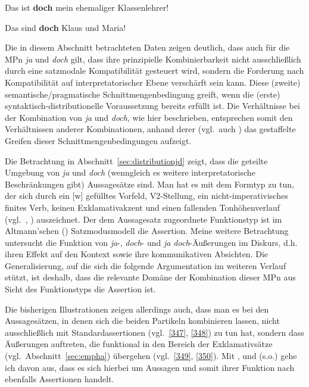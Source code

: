 \begin{exe}
	\ex\label{345} 
	Das ist \textbf{doch} mein ehemaliger Klassenlehrer!
	\hfill\hbox{\citet[196]{Rinas2006}}
\end{exe}

\begin{exe}
	\ex\label{346} 
	Das sind \textbf{doch} Klaus und Maria!	
	\hfill\hbox{\citet[86]{Dahl1988}}
\end{exe}											         
Die in diesem Abschnitt betrachteten Daten zeigen deutlich, dass auch für die MPn \textit{ja} und \textit{doch} gilt, dass ihre prinzipielle Kombinierbarkeit nicht ausschließlich durch eine satzmodale Kompatibilität gesteuert wird, sondern die Forderung nach Kompatibilität auf interpretatorischer Ebene verschärft sein kann. Diese (zweite) semantische/pragmatische Schnittmengenbedingung greift, wenn die (erste) syn\-taktisch-distributionelle Voraussetzung bereits erfüllt ist. Die Verhältnisse bei der Kombination von \textit{ja} und \textit{doch}, wie hier beschrieben, entsprechen somit den Verhältnissen anderer Kombinationen, anhand derer \citet[26--27]{Thurmair1991} (vgl.\ auch \citealt[Kapitel 3]{Thurmair1989}) das gestaffelte Greifen dieser Schnittmengenbedingungen aufzeigt. 

Die Betrachtung in Abschnitt~\ref{sec:distributionjd} zeigt, dass die geteilte Umgebung von \textit{ja} und \textit{doch} (wenngleich es weitere interpretatorische Beschrän\-kungen gibt) Aussagesätze sind. Man hat es mit dem Formtyp zu tun, der sich durch ein [\textminus w] gefülltes Vorfeld, V2-Stellung, ein nicht-imperativisches finites Verb, keinen Exklamativakzent und einen fallenden Tonhöhenverlauf (vgl.\ \citealt[44]{Thurmair1989}, \citealt[176--177]{Oppenrieder1987}) auszeichnet. Der dem Aussagesatz zugeordnete Funktionstyp ist im Altmann'schen (\citeyear{Altmann1984, Altmann1987}) Satzmodusmodell die Assertion. Meine weitere Betrachtung untersucht die Funktion von \textit{ja}-, \textit{doch}- und \textit{ja doch}-Äußerun\-gen im Diskurs, d.h. ihren Effekt auf den Kontext sowie ihre kommunikativen Absichten. Die Generalisierung, auf die sich die folgende Argumentation im weiteren Verlauf stützt, ist deshalb, dass die relevante Domäne der Kombination dieser MPn aus Sicht des Funktionstyps die Assertion  ist.

Die bisherigen Illustrationen zeigen allerdings auch, dass man es bei den Aussagesätzen, in denen sich die beiden Partikeln kombinieren lassen, nicht aus\-schließlich mit Standardassertionen (vgl.\ \ref{347}, \ref{348}) zu tun hat, sondern dass Äuße\-rungen auftreten, die funktional in den Bereich der Exklamativsätze (vgl.\ Abschnitt~\ref{sec:empha}) übergehen (vgl.\ \ref{349}, \ref{350}). Mit \citet[77--80]{Doherty1985}, \citet[107--108]{Thurmair1989} und \citet[37]{Kwon2005} (s.o.) gehe ich davon aus, dass es sich hierbei um Aussagen und somit ihrer Funktion nach ebenfalls Assertionen handelt.

